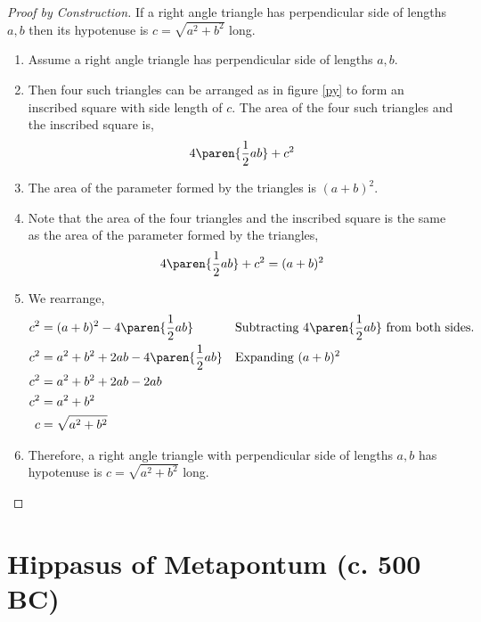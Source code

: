 \documentclass{homework}
\begin{document}
\begin{proof}[Proof by Construction] If a right angle triangle has perpendicular side of lengths $a,b$ then its hypotenuse is $c = \sqrt{a^2 + b^2}$ long.

    \begin{enumerate}
        \item Assume a right angle triangle has perpendicular side of lengths $a,b$.
        \item Then four such triangles can be arranged as in figure \ref{py} to form an inscribed square with side length of $c$. The area of the four such triangles and the inscribed square is,
              \[
                  4\paren{\frac{1}{2}ab}+c^2
              \]
        \item The area of the parameter formed by the triangles is $(a+b)^2$.
        \item Note that the area of the four triangles and the inscribed square is the same as the area of the parameter formed by the triangles,
              \[
                  4\paren{\frac{1}{2}ab}+c^2 = (a+b)^2
              \]
        \item We rearrange,
              \begin{align*}
                  c^2 & = (a+b)^2-4\paren{\frac{1}{2}ab}     &  & \text{Subtracting }4\paren{\frac{1}{2}ab} \text{ from both sides.} \\
                  c^2 & = a^2+b^2+2ab-4\paren{\frac{1}{2}ab} &  & \text{Expanding } (a+b)^2                                          \\
                  c^2 & = a^2+b^2+2ab-2ab                                                                                            \\
                  c^2 & = a^2+b^2                                                                                                    \\
                  c   & = \sqrt{a^2+b^2}                                                                                             \\
              \end{align*}
        \item Therefore, a right angle triangle with perpendicular side of lengths $a,b$ has hypotenuse is ${c = \sqrt{a^2 + b^2}}$ long. \qedhere
    \end{enumerate}
\end{proof}

\section{Hippasus of Metapontum (c. 500 BC)}
\end{document}
